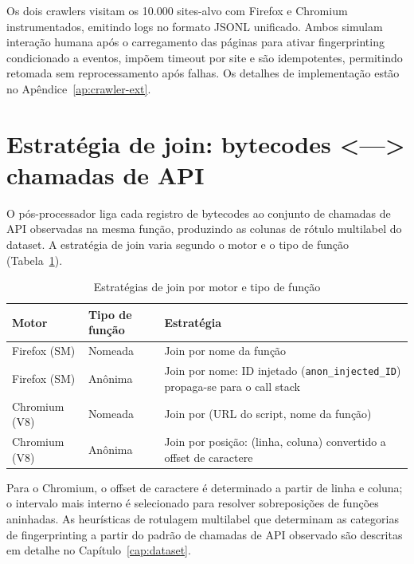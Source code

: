Os dois crawlers visitam os 10.000 sites-alvo com Firefox e Chromium
instrumentados, emitindo logs no formato JSONL unificado. Ambos simulam
interação humana após o carregamento das páginas para ativar fingerprinting
condicionado a eventos, impõem timeout por site e são idempotentes,
permitindo retomada sem reprocessamento após falhas. Os detalhes de
implementação estão no Apêndice~\ref{ap:crawler-ext}.

\section{Estratégia de join: bytecodes <---> chamadas de API}
\label{sec:join}

O pós-processador liga cada registro de bytecodes ao conjunto de chamadas de
API observadas na mesma função, produzindo as colunas de rótulo multilabel do
dataset. A estratégia de join varia segundo o motor e o tipo
de função (Tabela~\ref{tab:join}).

\begin{table}[htb]
\centering
\caption{Estratégias de join por motor e tipo de função}
\label{tab:join}
\begin{tabularx}{\linewidth}{llX}
\toprule
\textbf{Motor} & \textbf{Tipo de função} & \textbf{Estratégia} \\
\midrule
Firefox (SM) & Nomeada & Join por nome da função \\
Firefox (SM) & Anônima & Join por nome: ID injetado (\texttt{anon\_injected\_ID}) propaga-se para o call stack \\
Chromium (V8) & Nomeada & Join por (URL do script, nome da função) \\
Chromium (V8) & Anônima & Join por posição: (linha, coluna) convertido a offset de caractere \\
\bottomrule
\end{tabularx}
\end{table}

Para o Chromium, o offset de caractere é determinado a partir de linha e
coluna; o intervalo mais interno é selecionado para resolver sobreposições de
funções aninhadas. As heurísticas de rotulagem multilabel que determinam as
categorias de fingerprinting a partir do padrão de chamadas de API observado
são descritas em detalhe no Capítulo~\ref{cap:dataset}.
